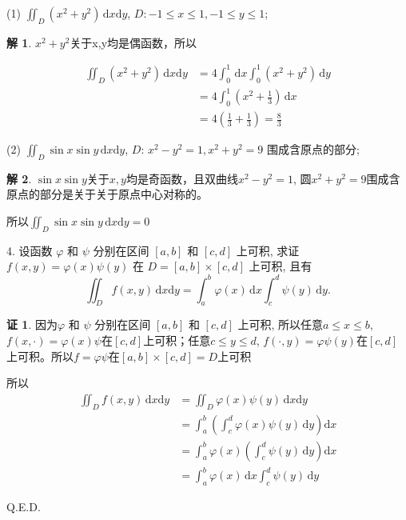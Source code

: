 \documentclass[a4paper,12pt]{article}
\theoremstyle{definition}
\newtheorem*{pf}{证}
\newtheorem*{sol}{解}
\begin{document}
(1) $\displaystyle \iint_{D} (x^2+y^2)\,\mathrm{d}x\mathrm{d}y$, $\displaystyle D: -1 \leq x \leq 1, -1 \leq y \leq 1$;
\begin{sol}
    $x^2+y^2$关于x,y均是偶函数，所以

    \begin{align*}
        \iint_{D} (x^2+y^2)\,\mathrm{d}x\mathrm{d}y
         & =4\int_0^1\,\mathrm{d}x\int_0^1 (x^2+y^2)\,\mathrm{d}y \\
         & =4\int_0^1(x^2+\frac{1}{3})\,\mathrm{d}x               \\
         & =4(\frac{1}{3}+\frac{1}{3})=\frac{8}{3}
    \end{align*}
\end{sol}
(2) $\displaystyle \iint_{D} \sin x \sin y\,\mathrm{d}x\mathrm{d}y$, $\displaystyle D$: $\displaystyle x^2-y^2=1, x^2+y^2=9$ 围成含原点的部分;
\begin{sol}
    $\sin x \sin y$关于$x,y$均是奇函数，且双曲线$x^2-y^2=1$, 圆$x^2+y^2=9$围成含原点的部分是关于关于原点中心对称的。

    所以$\iint_{D} \sin x \sin y\,\mathrm{d}x\mathrm{d}y=0$
\end{sol}


4. 设函数 $\varphi$ 和 $\psi$ 分别在区间 $[a,b]$ 和 $[c,d]$ 上可积, 求证 $f(x,y)=\varphi(x)\psi(y)$ 在 $D=[a,b]\times[c,d]$ 上可积, 且有
$$\iint_{D} f(x,y)\,\mathrm{d}x\mathrm{d}y = \int_{a}^{b} \varphi(x)\,\mathrm{d}x \int_{c}^{d} \psi(y)\,\mathrm{d}y.$$
\begin{pf}
    因为$\varphi$ 和 $\psi$ 分别在区间 $[a,b]$ 和 $[c,d]$ 上可积, 所以任意$a\leq x\leq b$, $f(x,\cdot)=\varphi(x)\psi$在$[c,d]$上可积；任意$c\leq y\leq d$, $f(\cdot,y)=\varphi\psi(y)$在$[c,d]$上可积。所以$f=\varphi\psi$在$[a,b]\times[c,d]=D$上可积

    所以
    \begin{align*}
        \iint_D f(x,y)\,\mathrm{d}x\mathrm{d}y
         & =\iint_D \varphi(x)\psi(y)\,\mathrm{d}x\mathrm{d}y                      \\
         & =\int_a^b(\int_c^d \varphi(x)\psi(y)\,\mathrm{d}y)\mathrm{d}x           \\
         & =\int_a^b\varphi(x)(\int_c^d \psi(y)\,\mathrm{d}y)\mathrm{d}x           \\
         & =\int_{a}^{b} \varphi(x)\,\mathrm{d}x \int_{c}^{d} \psi(y)\,\mathrm{d}y
    \end{align*}

    Q.E.D.
\end{pf}
\end{document}
